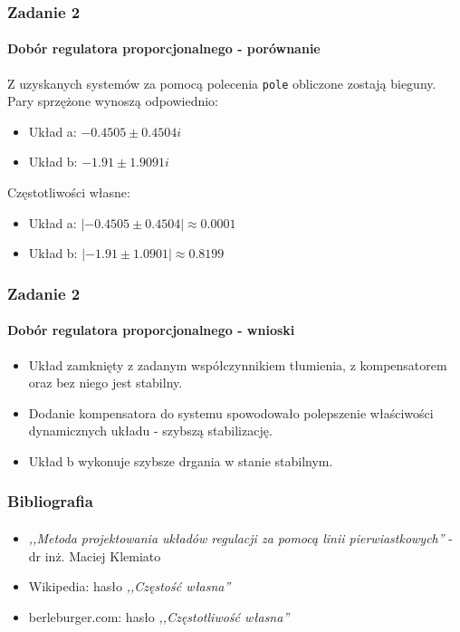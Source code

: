 \documentclass{beamer}
\begin{document}
\begin{frame}\frametitle{Zadanie 2}\framesubtitle{Dobór regulatora proporcjonalnego - porównanie}
Z uzyskanych systemów za pomocą polecenia \texttt{pole} obliczone zostają bieguny. Pary sprzężone wynoszą odpowiednio:

\begin{itemize}
	\item Układ a: $ -0.4505 \pm 0.4504i $ 
	\item Układ b: $ -1.91 \pm 1.9091i $
\end{itemize}

Częstotliwości własne:
\begin{itemize}
	\item Układ a: $ |-0.4505 \pm 0.4504| \approx 0.0001 $
	\item Układ b: $ |-1.91 \pm 1.0901| \approx 0.8199 $
\end{itemize}


\end{frame}

\begin{frame}\frametitle{Zadanie 2}\framesubtitle{Dobór regulatora proporcjonalnego - wnioski}
	\begin{itemize}
		\item Układ zamknięty z zadanym współczynnikiem tłumienia, z kompensatorem oraz bez niego jest stabilny.
		\item Dodanie kompensatora do systemu spowodowało polepszenie właściwości dynamicznych układu - szybszą stabilizację.
		\item Układ b wykonuje szybsze drgania w stanie stabilnym.
	\end{itemize}
\end{frame}

\begin{frame}\frametitle{Bibliografia}\framesubtitle{}
	\begin{itemize}
		\item \textit{,,Metoda projektowania układów regulacji za pomocą linii pierwiastkowych''} - dr inż. Maciej Klemiato
		
		\item Wikipedia: hasło \textit{,,Częstość własna''}
		
		\item berleburger.com: hasło \textit{,,Częstotliwość własna''}
	\end{itemize}
\end{frame}
\end{document}

